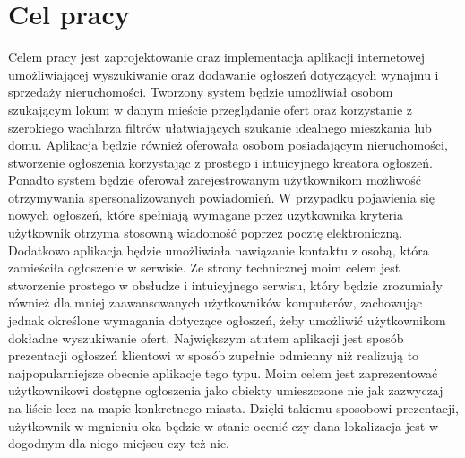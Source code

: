 
\section{Cel pracy}
\label{sec:celPracy}
Celem pracy jest zaprojektowanie oraz implementacja aplikacji internetowej umożliwiającej wyszukiwanie oraz dodawanie ogłoszeń dotyczących wynajmu i sprzedaży nieruchomości. Tworzony system będzie umożliwiał osobom szukającym lokum w danym mieście przeglądanie ofert oraz korzystanie z szerokiego wachlarza filtrów ułatwiających szukanie idealnego mieszkania lub domu. Aplikacja będzie również oferowała osobom posiadającym nieruchomości, stworzenie ogłoszenia korzystając z prostego i intuicyjnego kreatora ogłoszeń. Ponadto system będzie oferował zarejestrowanym użytkownikom możliwość otrzymywania  spersonalizowanych powiadomień. W przypadku pojawienia się nowych ogłoszeń, które spełniają wymagane przez użytkownika kryteria użytkownik otrzyma stosowną wiadomość poprzez pocztę elektroniczną. Dodatkowo aplikacja będzie umożliwiała nawiązanie kontaktu z osobą, która zamieściła ogłoszenie w serwisie. Ze strony technicznej moim celem jest stworzenie prostego w obsłudze i intuicyjnego serwisu, który będzie zrozumiały również dla mniej zaawansowanych użytkowników komputerów, zachowując jednak określone wymagania dotyczące ogłoszeń, żeby umożliwić użytkownikom dokładne wyszukiwanie ofert. Największym atutem aplikacji jest sposób prezentacji ogłoszeń klientowi w sposób zupełnie odmienny niż realizują to najpopularniejsze obecnie aplikacje tego typu. Moim celem jest zaprezentować użytkownikowi dostępne ogłoszenia jako obiekty umieszczone nie jak zazwyczaj na liście lecz na mapie konkretnego miasta. Dzięki takiemu sposobowi prezentacji, użytkownik w mgnieniu oka będzie w stanie ocenić czy dana lokalizacja jest w dogodnym dla niego miejscu czy też nie.
